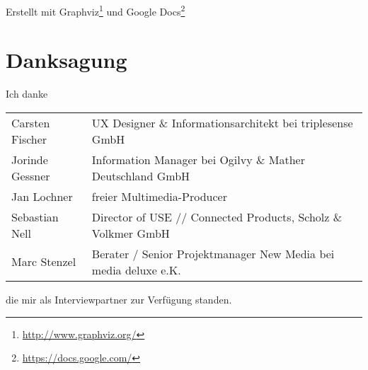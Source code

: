 \documentclass[11pt,a4paper]{article}
\begin{document}
Erstellt mit Graphviz\footnote{\url{http://www.graphviz.org/}} und Google Docs\footnote{\url{https://docs.google.com/}}

\vspace{1cm}

\pagebreak

\section*{Danksagung}

\TODO

Ich danke 

\begin{tabular}{@{}l l}
Carsten Fischer & UX Designer \& Informationsarchitekt bei triplesense GmbH\\
Jorinde Gessner & Information Manager bei Ogilvy \& Mather Deutschland GmbH\\
Jan Lochner & freier Multimedia-Producer\\
Sebastian Nell & Director of USE // Connected Products, Scholz \& Volkmer GmbH\\
Marc Stenzel & Berater / Senior Projektmanager New Media bei media deluxe e.K.
\end{tabular}

die mir als Interviewpartner zur Verfügung standen.

\pagebreak



\pagebreak

\tableofcontents

\pagebreak

\setcounter{page}{1}









\pagebreak


\end{document}
